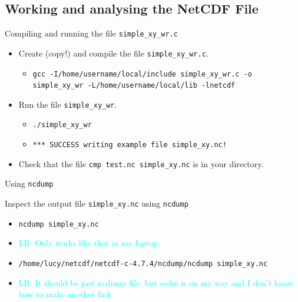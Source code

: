 \documentclass[compress,11pt,xcolor=svgnames,aspectratio=169]{beamer}
\newcommand{\lr}[1]{\textcolor{cyan}{LR: #1}}
\begin{document}
\subsection{Working and analysing the NetCDF File}

\begin{frame}[fragile]{Compiling and running the file \texttt{simple\_xy\_wr.c}}

\begin{itemize}
\setlength\itemsep{0.6cm}

  \item Create (copy!) and compile the file \verb|simple_xy_wr.c|.

    \begin{itemize}
      \item {\tiny \verb|gcc -I/home/username/local/include simple_xy_wr.c -o simple_xy_wr -L/home/username/local/lib -lnetcdf|}
    \end{itemize}

  \item Run the file \verb|simple_xy_wr|.

      \begin{itemize}
        \item {\tiny  \verb|./simple_xy_wr|}
        \item {\tiny  \verb|*** SUCCESS writing example file simple_xy.nc!|}\\[0.5cm]
      \end{itemize}

  \item Check that the file \verb|cmp test.nc simple_xy.nc| is in your directory.

\end{itemize}

\end{frame}

\begin{frame}[fragile]{Using \texttt{ncdump}}

Inspect the output file \verb|simple_xy.nc| using \verb|ncdump|

\begin{itemize}

  \item \verb|ncdump simple_xy.nc|

  \item \lr{Only works like that in my laptop:}

  \item \verb|/home/lucy/netcdf/netcdf-c-4.7.4/ncdump/ncdump simple_xy.nc|

  \item \lr{It should be just ncdump file, but esdm is on my way and I don’t know how to make another link}

\end{itemize}

\end{frame}
\end{document}
